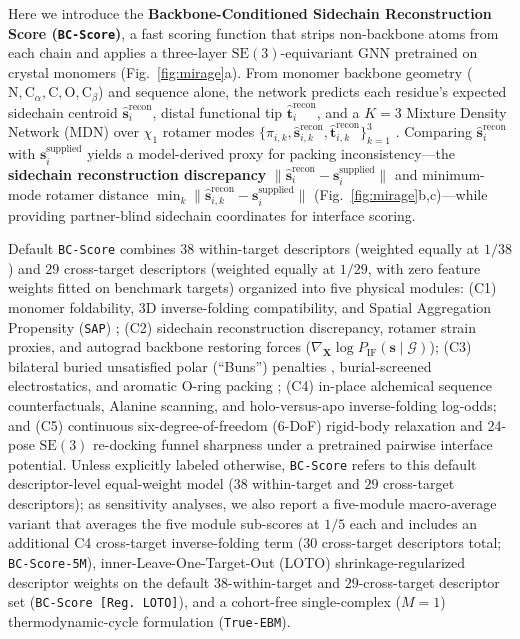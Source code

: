 \documentclass[10pt,twocolumn]{article}
\begin{document}
Here we introduce the \textbf{Backbone-Conditioned Sidechain Reconstruction Score (\texttt{BC-Score})}, a fast scoring function that strips non-backbone atoms from each chain and applies a three-layer $\text{SE}(3)$-equivariant GNN \cite{satorras2021egnn,jing2021gvp} pretrained on crystal monomers \cite{kringelum2012discotope,dunbar2014sabdab} (Fig.~\ref{fig:mirage}a). From monomer backbone geometry ($\text{N}, \text{C}_\alpha, \text{C}, \text{O}, \text{C}_\beta$) and sequence alone, the network predicts each residue's expected sidechain centroid $\hat{\mathbf{s}}_i^{\text{recon}}$, distal functional tip $\hat{\mathbf{t}}_i^{\text{recon}}$, and a $K=3$ Mixture Density Network (MDN) \cite{bishop1994mdn} over $\chi_1$ rotamer modes $\{\pi_{i,k}, \hat{\mathbf{s}}_{i,k}^{\text{recon}}, \hat{\mathbf{t}}_{i,k}^{\text{recon}}\}_{k=1}^3$ \cite{shapovalov2011dunbrack}. Comparing $\hat{\mathbf{s}}_i^{\text{recon}}$ with $\mathbf{s}_i^{\text{supplied}}$ yields a model-derived proxy for packing inconsistency---the \textbf{sidechain reconstruction discrepancy} $\|\hat{\mathbf{s}}_i^{\text{recon}} - \mathbf{s}_i^{\text{supplied}}\|$ and minimum-mode rotamer distance $\min_k \|\hat{\mathbf{s}}_{i,k}^{\text{recon}} - \mathbf{s}_i^{\text{supplied}}\|$ (Fig.~\ref{fig:mirage}b,c)---while providing partner-blind sidechain coordinates for interface scoring.

Default \texttt{BC-Score} combines $38$ within-target descriptors (weighted equally at $1/38$) and $29$ cross-target descriptors (weighted equally at $1/29$, with zero feature weights fitted on benchmark targets) organized into five physical modules: (C1) monomer foldability, 3D inverse-folding compatibility, and Spatial Aggregation Propensity (\texttt{SAP}) \cite{chennamsetty2009sap}; (C2) sidechain reconstruction discrepancy, rotamer strain proxies, and autograd backbone restoring forces ($\nabla_{\mathbf{X}} \log P_{\text{IF}}(\mathbf{s}\mid\mathcal{G})$); (C3) bilateral buried unsatisfied polar (``Buns'') penalties \cite{coventry2021buried}, burial-screened electrostatics, and aromatic O-ring packing \cite{bogan1998anatomy}; (C4) in-place alchemical sequence counterfactuals, Alanine scanning, and holo-versus-apo inverse-folding log-odds; and (C5) continuous six-degree-of-freedom (6-DoF) rigid-body relaxation and 24-pose $\text{SE}(3)$ re-docking funnel sharpness under a pretrained pairwise interface potential. Unless explicitly labeled otherwise, \texttt{BC-Score} refers to this default descriptor-level equal-weight model ($38$ within-target and $29$ cross-target descriptors); as sensitivity analyses, we also report a five-module macro-average variant that averages the five module sub-scores at $1/5$ each and includes an additional C4 cross-target inverse-folding term ($30$ cross-target descriptors total; \texttt{BC-Score-5M}), inner-Leave-One-Target-Out (LOTO) shrinkage-regularized descriptor weights on the default $38$-within-target and $29$-cross-target descriptor set (\texttt{BC-Score [Reg.\ LOTO]}), and a cohort-free single-complex ($M=1$) thermodynamic-cycle formulation (\texttt{True-EBM}).
\end{document}
